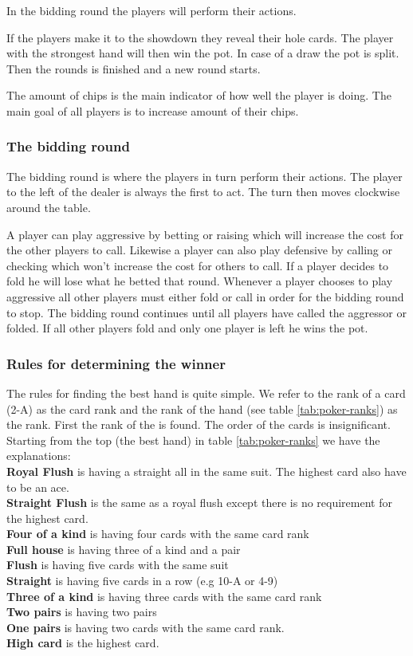 In the bidding round the players will perform their actions.

If the players make it to the showdown they reveal their hole cards. The player with the strongest hand will then win the pot. In case of a draw the pot is split. Then the rounds is finished and a new round starts.
 
The amount of chips is the main indicator of how well the player is doing. The main goal of all players is to increase amount of their chips.

\subsubsection*{The bidding round}
The bidding round is where the players in turn perform their actions. The player to the left of the dealer is always the first to act. The turn then moves clockwise around the table. 

A player can play aggressive by betting or raising which will increase the cost for the other players to call. Likewise a player can also play defensive by calling or checking which won't increase the cost for others to call. If a player decides to fold he will lose what he betted that round. Whenever a player chooses to play aggressive all other players must either fold or call in order for the bidding round to stop. The bidding round continues until all players have called the aggressor or folded. If all other players fold and only one player is left he wins the pot.

\subsubsection*{Rules for determining the winner}
The rules for finding the best hand is quite simple. We refer to the rank of a card (2-A) as the card rank and the rank of the hand (see table \ref{tab:poker-ranks}) as the rank. First the rank of the  is found. The order of the cards is insignificant. Starting from the top (the best hand) in table \ref{tab:poker-ranks} we have the explanations:\\
\textbf{Royal Flush} is having a straight all in the same suit. The highest card also have to be an ace.\\
\textbf{Straight Flush} is the same as a royal flush except there is no requirement for the highest card.\\
\textbf{Four of a kind} is having four cards with the same card rank \\
\textbf{Full house} is having three of a kind and a pair\\
\textbf{Flush} is having five cards with the same suit\\
\textbf{Straight} is having five cards in a row (e.g 10-A or 4-9)\\
\textbf{Three of a kind} is having three cards with the same card rank \\
\textbf{Two pairs} is having two pairs\\
\textbf{One pairs} is having two cards with the same card rank. \\
\textbf{High card} is the highest card. \\


